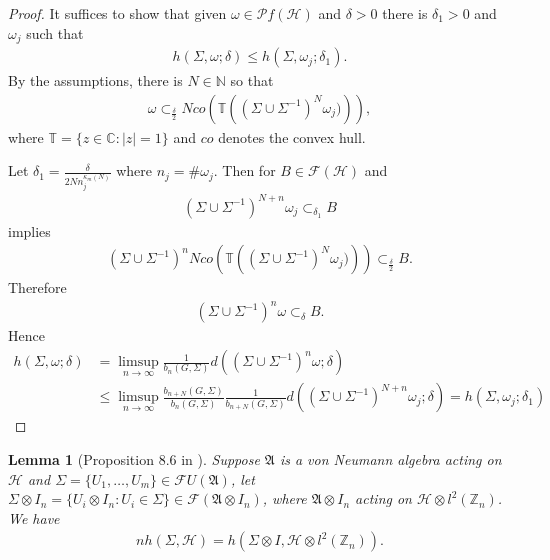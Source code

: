 \documentclass[a4paper,10pt]{amsart}
\newtheorem{lemma}{Lemma}[section]
\newcommand{\AAA}{\mathfrak A}
\newcommand{\HHH}{\mathscr H} %
\newcommand{\PP}{\mathscr P}
\newcommand{\FF}{\mathscr F}
\newcommand{\C}{\mathbb C} %
\newcommand{\Z}{\mathbb Z} %
\newcommand{\N}{\mathbb N} %
\begin{document}
\begin{proof}
    It suffices to show that given $\omega \in \PP f(\HHH)$ and 
    $\delta > 0$ there is $\delta_{1} > 0$ and $\omega_{j}$ such that
    \begin{align*}
        h(\Sigma, \omega; \delta) \leq h(\Sigma, \omega_{j}; \delta_1). 
    \end{align*}
    By the assumptions, there is $N \in \N$ so that
    \begin{align*}
        \omega \subset_{\frac{\delta}{2}}N 
        co\left ( \mathbb{T} \left ( 
(\Sigma \cup \Sigma^{-1})^{N} \omega_{j}) \right) \right),
    \end{align*}
    where $\mathbb{T} = \{z \in \C: |z|=1\}$ and $co$ denotes
    the convex hull.

    Let $\delta_{1} = \frac{\delta}{2Nn_{j}^{\kappa_m(N)}}$ where
    $n_j = \#\omega_{j}$. Then for $B \in \FF(\HHH)$ and 
    \begin{align*}
        (\Sigma \cup \Sigma^{-1})^{N+n}\omega_{j} \subset_{\delta_1} B
    \end{align*}
    implies
    \begin{align*}
        (\Sigma \cup \Sigma^{-1})^{n}
        N co\left ( \mathbb{T} \left ( 
        (\Sigma \cup \Sigma^{-1})^{N} \omega_{j}) \right) \right)
        \subset_{\frac{\delta}{2}} B.
    \end{align*}
    Therefore
    \begin{align*}
        (\Sigma \cup \Sigma^{-1})^{n} \omega
        \subset_{\delta} B.
    \end{align*}
    Hence
    \begin{align*}
        h(\Sigma, \omega; \delta) &=
           \limsup\limits_{n \rightarrow \infty}
           \frac{1}{b_{n}(G, \Sigma)}d\left 
           ((\Sigma \cup \Sigma^{-1})^{n}\omega
            ; \delta \right ) \\
           & \leq 
           \limsup\limits_{n \rightarrow \infty}
       \frac{b_{n+N}(G, \Sigma)}{b_{n}(G, \Sigma)} 
           \frac{1}{b_{n+N}(G, \Sigma)}d\left 
           ((\Sigma \cup \Sigma^{-1})^{N+n}\omega_j
            ; \delta \right ) =  
        h(\Sigma, \omega_{j}; \delta_1)
    \end{align*}
\end{proof}

\begin{lemma}[Proposition 8.6 in \cite{V}]
   Suppose $\AAA$ is a von Neumann algebra acting on $\HHH$ and 
   $\Sigma = \{U_1, \ldots, U_m \} \in \FF U(\AAA)$, let 
   $\Sigma \otimes I_n = \{U_i \otimes I_n: U_i \in \Sigma\} \in
   \FF (\AAA \otimes I_n)$, where $\AAA \otimes I_n$ acting on 
   $\HHH \otimes l^{2}(\Z_n)$. We have
   \begin{align*}
       nh(\Sigma, \HHH) = h(\Sigma \otimes I, \HHH\otimes l^2(\Z_n)). 
   \end{align*}
\end{lemma}
\end{document}
